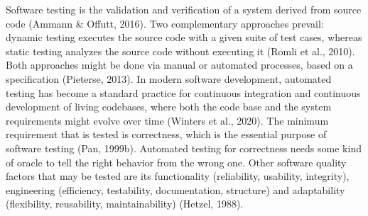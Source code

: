 \documentclass[../main]{subfiles}
\begin{document}
Software testing is the validation and verification of a system derived from source code (Ammann \& Offutt, 2016).
Two complementary approaches prevail: dynamic testing executes the source code with a given suite of test cases, whereas static testing analyzes the source code without executing it (Romli et al., 2010). Both approaches might be done via manual or automated processes, based on a specification (Pieterse, 2013). In modern software development, automated testing has become a standard practice for continuous integration and continuous development of living codebases, where both the code base and the system requirements might evolve over time (Winters et al., 2020). The minimum requirement that is tested is correctness, which is the essential purpose of software testing (Pan, 1999b). Automated testing for correctness needs some kind of oracle to tell the right behavior from the wrong one. Other software quality factors that may be tested are its functionality (reliability, usability, integrity), engineering (efficiency, testability, documentation, structure) and adaptability (flexibility, reusability, maintainability) (Hetzel, 1988).
\end{document}
